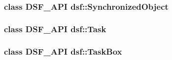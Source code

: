 \subsubsection[{Synchronized\+Object}]{\setlength{\rightskip}{0pt plus 5cm}class {\bf D\+S\+F\+\_\+\+A\+P\+I} {\bf dsf\+::\+Synchronized\+Object}}\label{namespacedsf_acbf1798fc56cfb1707162a17e13f5fda}
\hypertarget{namespacedsf_a7df24c7d3d82e2e686aa3a524dc1dee9}{}
\subsubsection[{Task}]{\setlength{\rightskip}{0pt plus 5cm}class {\bf D\+S\+F\+\_\+\+A\+P\+I} {\bf dsf\+::\+Task}}\label{namespacedsf_a7df24c7d3d82e2e686aa3a524dc1dee9}
\hypertarget{namespacedsf_ac3c92e2a98380dd728b0c18d0c495966}{}
\subsubsection[{Task\+Box}]{\setlength{\rightskip}{0pt plus 5cm}class {\bf D\+S\+F\+\_\+\+A\+P\+I} {\bf dsf\+::\+Task\+Box}}\label{namespacedsf_ac3c92e2a98380dd728b0c18d0c495966}
